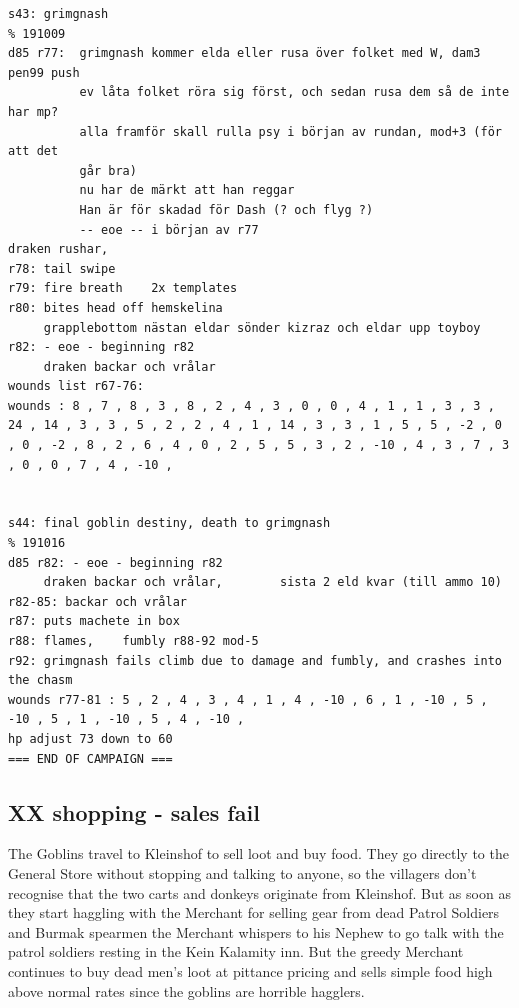 \begin{verbatim}
s43: grimgnash                                                          % 191009
d85 r77:  grimgnash kommer elda eller rusa över folket med W, dam3 pen99 push
          ev låta folket röra sig först, och sedan rusa dem så de inte har mp?
          alla framför skall rulla psy i början av rundan, mod+3 (för att det 
          går bra)
          nu har de märkt att han reggar
          Han är för skadad för Dash (? och flyg ?)
          -- eoe -- i början av r77
draken rushar, 
r78: tail swipe
r79: fire breath    2x templates
r80: bites head off hemskelina
     grapplebottom nästan eldar sönder kizraz och eldar upp toyboy
r82: - eoe - beginning r82
     draken backar och vrålar
wounds list r67-76: 
wounds : 8 , 7 , 8 , 3 , 8 , 2 , 4 , 3 , 0 , 0 , 4 , 1 , 1 , 3 , 3 , 24 , 14 , 3 , 3 , 5 , 2 , 2 , 4 , 1 , 14 , 3 , 3 , 1 , 5 , 5 , -2 , 0 , 0 , -2 , 8 , 2 , 6 , 4 , 0 , 2 , 5 , 5 , 3 , 2 , -10 , 4 , 3 , 7 , 3 , 0 , 0 , 7 , 4 , -10 ,


s44: final goblin destiny, death to grimgnash                           % 191016
d85 r82: - eoe - beginning r82
     draken backar och vrålar,        sista 2 eld kvar (till ammo 10)
r82-85: backar och vrålar
r87: puts machete in box
r88: flames,    fumbly r88-92 mod-5
r92: grimgnash fails climb due to damage and fumbly, and crashes into the chasm
wounds r77-81 : 5 , 2 , 4 , 3 , 4 , 1 , 4 , -10 , 6 , 1 , -10 , 5 , -10 , 5 , 1 , -10 , 5 , 4 , -10 ,
hp adjust 73 down to 60
=== END OF CAMPAIGN ===
\end{verbatim} \normalsize








\subsection*{XX shopping - sales fail}

The Goblins travel to Kleinshof to sell loot and buy food. They go directly to the General Store without stopping and talking to anyone, so the villagers don't recognise that the two carts and donkeys originate from Kleinshof. But as soon as they start haggling with the Merchant for selling gear from dead Patrol Soldiers and Burmak spearmen the Merchant whispers to his Nephew to go talk with the patrol soldiers resting in the Kein Kalamity inn. But the greedy Merchant continues to buy dead men's loot at pittance pricing and sells simple food high above normal rates since the goblins are horrible hagglers.

